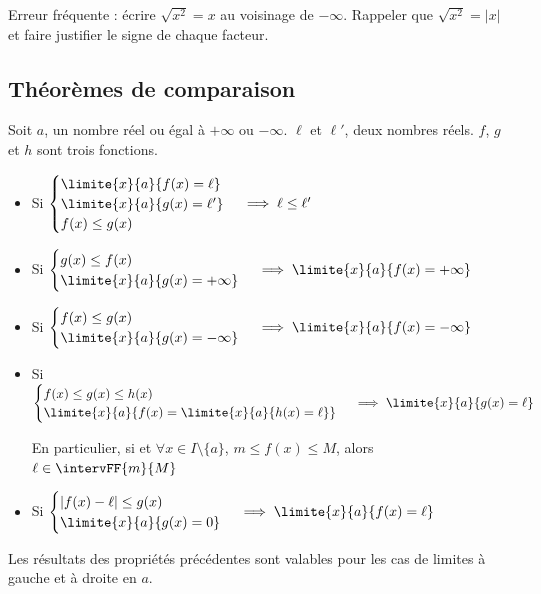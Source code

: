 \begin{noteprof}
Erreur fréquente : écrire $\sqrt{x^2}=x$ au voisinage de $-\infty$. Rappeler que $\sqrt{x^2}=|x|$ et faire justifier le signe de chaque facteur.
\end{noteprof}
\ifenseignant %
  \subsection{Théorèmes de comparaison}
\begin{propriete}[s]
	Soit $a$, un nombre réel ou égal à $+\infty$ ou $-\infty$. $\ell$ et $\ell'$, deux nombres réels. $f$, $g$ et $h$ sont trois fonctions.
	\begin{itemize}
		\item Si $\begin{cases}
		\limite{x}{a}{f(x)=\ell} \\
		\limite{x}{a}{g(x)=\ell'}\\
		f(x)\leq g(x)
		\end{cases}\implies \ell \leq \ell'$
		\item Si $\begin{cases}
		g(x)\leq f(x)\\
		\limite{x}{a}{g(x)=+\infty}
		\end{cases}\implies \limite{x}{a}{f(x)=+\infty} $
		\item Si $\begin{cases}
		f(x)\leq g(x)\\
		\limite{x}{a}{g(x)=-\infty}
		\end{cases}\implies \limite{x}{a}{f(x)=-\infty} $
		\item Si $\begin{cases}
		f(x)\leq g(x)\leq h(x)\\
		\limite{x}{a}{f(x)=\limite{x}{a}{h(x)=\ell}}
		\end{cases}\implies \limite{x}{a}{g(x)=\ell} $
		\par En particulier, si  et $\forall x \in I\setminus\{a\}$, $m\leq f(x)\leq M$, alors $\ell\in \intervFF{m}{M}$
		\item Si $\begin{cases}
		\lvert f(x)-\ell\rvert \leq g(x)\\
		\limite{x}{a}{g(x)=0}
		\end{cases}\implies \limite{x}{a}{f(x)=\ell}$
	\end{itemize}
Les résultats des propriétés précédentes sont valables pour les cas de limites à gauche et à droite en $a$.
\end{propriete}
